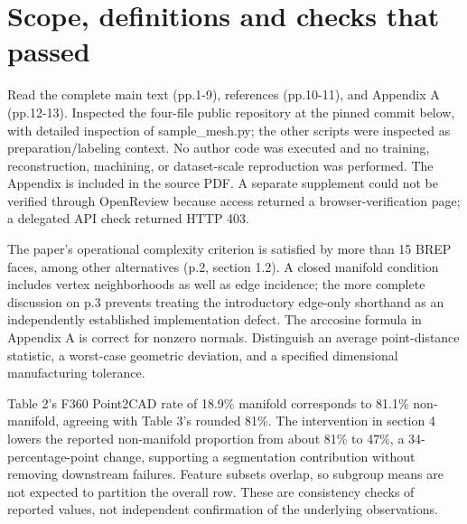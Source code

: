\documentclass[10pt]{article}
\begin{document}
\section*{Scope, definitions and checks that passed}
Read the complete main text (pp.1-9), references (pp.10-11), and Appendix A (pp.12-13). Inspected the four-file public repository at the pinned commit below, with detailed inspection of sample\_mesh.py; the other scripts were inspected as preparation/labeling context. No author code was executed and no training, reconstruction, machining, or dataset-scale reproduction was performed. The Appendix is included in the source PDF. A separate supplement could not be verified through OpenReview because access returned a browser-verification page; a delegated API check returned HTTP 403.\par
The paper’s operational complexity criterion is satisfied by more than 15 BREP faces, among other alternatives (p.2, section 1.2). A closed manifold condition includes vertex neighborhoods as well as edge incidence; the more complete discussion on p.3 prevents treating the introductory edge-only shorthand as an independently established implementation defect. The arccosine formula in Appendix A is correct for nonzero normals. Distinguish an average point-distance statistic, a worst-case geometric deviation, and a specified dimensional manufacturing tolerance.\par
Table 2’s F360 Point2CAD rate of 18.9\% manifold corresponds to 81.1\% non-manifold, agreeing with Table 3’s rounded 81\%. The intervention in section 4 lowers the reported non-manifold proportion from about 81\% to 47\%, a 34-percentage-point change, supporting a segmentation contribution without removing downstream failures. Feature subsets overlap, so subgroup means are not expected to partition the overall row. These are consistency checks of reported values, not independent confirmation of the underlying observations.\par
\end{document}
